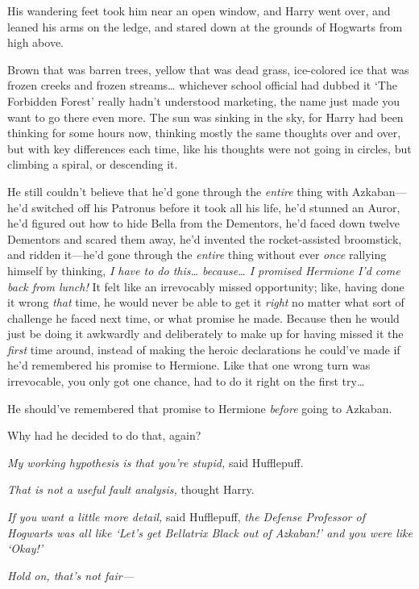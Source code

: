 His wandering feet took him near an open window, and Harry went over, and leaned his arms on the ledge, and stared down at the grounds of Hogwarts from high above.

Brown that was barren trees, yellow that was dead grass, ice-colored ice that was frozen creeks and frozen streams{\ldots} whichever school official had dubbed it `The Forbidden Forest' really hadn't understood marketing, the name just made you want to go there even more. The sun was sinking in the sky, for Harry had been thinking for some hours now, thinking mostly the same thoughts over and over, but with key differences each time, like his thoughts were not going in circles, but climbing a spiral, or descending it.

He still couldn't believe that he'd gone through the \emph{entire} thing with Azkaban---he'd switched off his Patronus before it took all his life, he'd stunned an Auror, he'd figured out how to hide Bella from the Dementors, he'd faced down twelve Dementors and scared them away, he'd invented the rocket-assisted broomstick, and ridden it---he'd gone through the \emph{entire} thing without ever \emph{once} rallying himself by thinking, \emph{I have to do this{\ldots} because{\ldots} I promised Hermione I'd come back from lunch!} It felt like an irrevocably missed opportunity; like, having done it wrong \emph{that} time, he would never be able to get it \emph{right} no matter what sort of challenge he faced next time, or what promise he made. Because then he would just be doing it awkwardly and deliberately to make up for having missed it the \emph{first} time around, instead of making the heroic declarations he could've made if he'd remembered his promise to Hermione. Like that one wrong turn was irrevocable, you only got one chance, had to do it right on the first try{\ldots}

He should've remembered that promise to Hermione \emph{before} going to Azkaban.

Why had he decided to do that, again?

\emph{My working hypothesis is that you're stupid,} said Hufflepuff.

\emph{That is not a useful fault analysis,} thought Harry.

\emph{If you want a little more detail,} said Hufflepuff, \emph{the Defense Professor of Hogwarts was all like `Let's get Bellatrix Black out of Azkaban!' and you were like `Okay!'}

\emph{Hold on, \emph{that's} not fair---}

